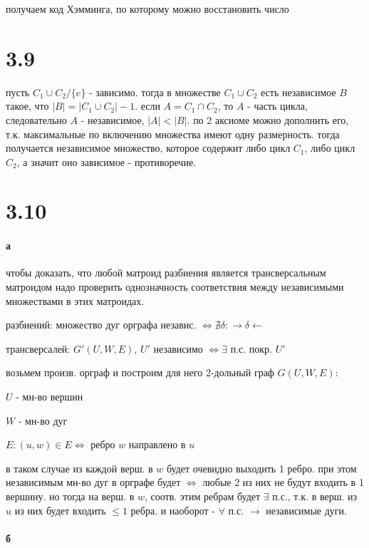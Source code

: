 \documentclass[russian]{article}
\begin{document}
получаем код Хэмминга, по которому можно восстановить число

\section*{3.9}

пусть $C_1 \cup C_2 / \{e\}$ - зависимо. тогда в множестве $C_1 \cup C_2$ есть независимое $B$ такое, что $|B|=|C_1 \cup C_2| - 1$. если $A=C_1 \cap C_2$, то $A$ - часть цикла, следовательно $A$ - независимое, $|A| < |B|$. по 2 аксиоме можно дополнить его, т.к. максимальные по включению множества имеют одну размерность. тогда получается независимое множество, которое содержит либо цикл $C_1$, либо цикл $C_2$, а значит оно зависимое - противоречие.

\section*{3.10}

\paragraph{а}

чтобы доказать, что любой матроид разбиения является трансверсальным матроидом надо проверить однозначность соответствия между независимыми множествами в этих матроидах. 

разбиений: множество дуг орграфа независ. $\iff \nexists \delta : \to \delta \leftarrow$

трансверсалей: $G'(U,W,E)$, $U'$ независимо $\iff \exists $ п.с. покр. $U'$

возьмем произв. орграф и построим для него 2-дольный граф $G(U,W,E)$:

$U$ - мн-во вершин

$W$ - мн-во дуг

$E:(u,w) \in E \iff $ ребро $w$ направлено в $u$

в таком случае из каждой верш. в $w$ будет очевидно выходить 1 ребро. при этом независимым мн-во дуг в орграфе будет $\iff$ любые 2 из них не будут входить в 1 вершину. но тогда на верш. в $w$, соотв. этим ребрам будет $\exists$ п.с., т.к. в верш. из $u$ из них будет входить $\le 1$ ребра. и наоборот - $\forall$ п.с. $\to$ независимые дуги.

\paragraph{б}
\end{document}
